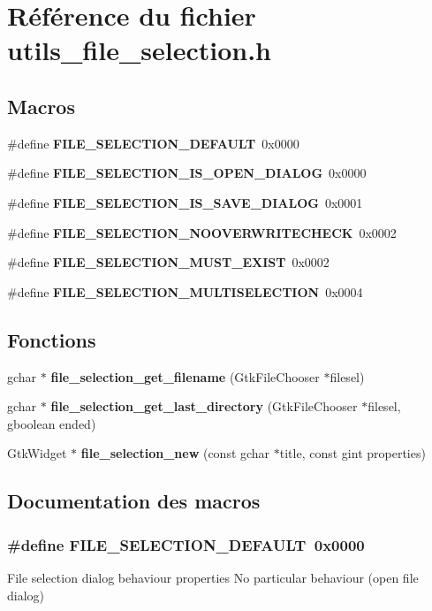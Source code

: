 \section{Référence du fichier utils\_\-file\_\-selection.h}
\label{utils__file__selection_8h}
\subsection*{Macros}
\begin{DoxyCompactItemize}
\item 
\#define {\bf FILE\_\-SELECTION\_\-DEFAULT}~0x0000
\item 
\#define {\bf FILE\_\-SELECTION\_\-IS\_\-OPEN\_\-DIALOG}~0x0000
\item 
\#define {\bf FILE\_\-SELECTION\_\-IS\_\-SAVE\_\-DIALOG}~0x0001
\item 
\#define {\bf FILE\_\-SELECTION\_\-NOOVERWRITECHECK}~0x0002
\item 
\#define {\bf FILE\_\-SELECTION\_\-MUST\_\-EXIST}~0x0002
\item 
\#define {\bf FILE\_\-SELECTION\_\-MULTISELECTION}~0x0004
\end{DoxyCompactItemize}
\subsection*{Fonctions}
\begin{DoxyCompactItemize}
\item 
gchar $\ast$ {\bf file\_\-selection\_\-get\_\-filename} (GtkFileChooser $\ast$filesel)
\item 
gchar $\ast$ {\bf file\_\-selection\_\-get\_\-last\_\-directory} (GtkFileChooser $\ast$filesel, gboolean ended)
\item 
GtkWidget $\ast$ {\bf file\_\-selection\_\-new} (const gchar $\ast$title, const gint properties)
\end{DoxyCompactItemize}


\subsection{Documentation des macros}
\subsubsection[{FILE\_\-SELECTION\_\-DEFAULT}]{\setlength{\rightskip}{0pt plus 5cm}\#define FILE\_\-SELECTION\_\-DEFAULT~0x0000}\label{utils__file__selection_8h_a6a4bee62214d9dfd2b4bba67a1e105e3}
File selection dialog behaviour properties No particular behaviour (open file dialog) 

